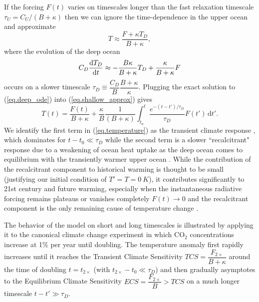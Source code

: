 \documentclass{article}
\begin{document}
If the forcing $F(t)$ varies on timescales longer than the fast relaxation timescale $\tau_{U} = C_{U}/(B + \kappa)$ then we can ignore the time-dependence in the upper ocean and approximate
\begin{equation}
    T \approx \frac{F+\kappa T_{D}}{B + \kappa},
    \label{eq.shallow_approx}
\end{equation}
where the evolution of the deep ocean
\begin{equation}
    C_{D} \dv{T_{D}}{t} \approx - \frac{B \kappa}{B + \kappa} T_{D} + \frac{\kappa}{B + \kappa} F
    \label{eq.deep_ode}
\end{equation}
occurs on a slower timescale $\tau_{D} \equiv \dfrac{C_{D}}{B} \dfrac{B + \kappa}{\kappa}$. Plugging the exact solution to (\ref{eq.deep_ode}) into (\ref{eq.shallow_approx}) gives
\begin{equation}
    T(t) = \frac{F(t)}{B + \kappa} + \frac{\kappa}{B} \frac{1}{(B+\kappa)} \int_{t_{0}}^{t} \frac{ e^{-(t-t')/\tau_{D}}}{\tau_{D}} F(t') \, \text{d}t'.\label{eq.temperature}
\end{equation}
We identify the first term in (\ref{eq.temperature}) as the transient climate response \citep{gregory_transient_2008}, which dominates for $t-t_{0} \ll \tau_{D}$ while the second term is a slower ``recalcitrant" response due to a weakening of ocean heat uptake as the deep ocean comes to equilibrium with the transiently warmer upper ocean \citep{held_probing_2010}. While the contribution of the recalcitrant component to historical warming is thought to be small (justifying our initial condition of $T' = T = \SI{0}{K}$), it contributes significantly to 21st century and future warming, especially when the instantaneous radiative forcing remains plateaus or vanishes completely $F(t) \rightarrow 0$ and the recalcitrant component is the only remaining cause of temperature change \citep{gregory_transient_2008, held_probing_2010}.

The behavior of the model on short and long timescales is illustrated by applying it to the canonical climate change experiment in which CO$_{2}$ concentrations increase at 1\% per year until doubling. The temperature anomaly first rapidly increases until it reaches the Transient Climate Sensitivity $TCS = \dfrac{F_{2\times}}{B + \kappa}$ around the time of doubling $t=t_{2\times}$ (with $t_{2\times} - t_{0} \ll \tau_{D}$) and then gradually asymptotes to the Equilibrium Climate Sensitivity $ECS = \dfrac{F_{2\times}}{B} > TCS$ on a much longer timescale $t-t' \gg \tau_{D}$.
\end{document}
